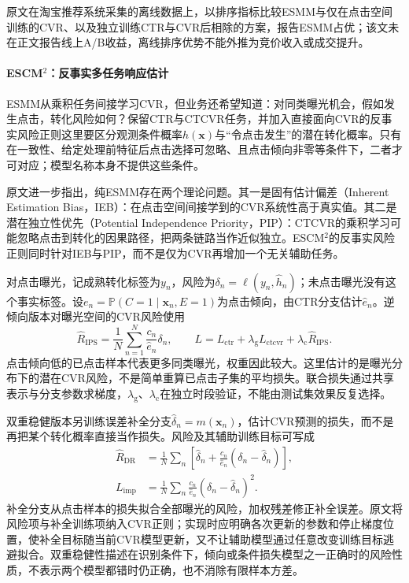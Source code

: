 原文在淘宝推荐系统采集的离线数据上，以排序指标比较ESMM与仅在点击空间训练的CVR、以及独立训练CTR与CVR后相除的方案，报告ESMM占优；该文未在正文报告线上A/B收益，离线排序优势不能外推为竞价收入或成交提升。

\Needspace{90mm}
\paragraph{ESCM$^2$：反事实多任务响应估计}
\label{sec:rs-advertising-escm2}

ESMM从乘积任务间接学习CVR，但业务还希望知道：对同类曝光机会，假如发生点击，转化风险如何？保留CTR与CTCVR任务，并加入直接面向CVR的反事实风险正则这里要区分观测条件概率$h(\bm{x})$与“令点击发生”的潜在转化概率。只有在一致性、给定处理前特征后点击选择可忽略、且点击倾向非零等条件下，二者才可对应；模型名称本身不提供这些条件。

原文进一步指出，纯ESMM存在两个理论问题。其一是固有估计偏差（Inherent Estimation Bias，IEB）：在点击空间间接学到的CVR系统性高于真实值。其二是潜在独立性优先（Potential Independence Priority，PIP）：CTCVR的乘积学习可能忽略点击到转化的因果路径，把两条链路当作近似独立。ESCM$^2$的反事实风险正则同时针对IEB与PIP，而不是仅为CVR再增加一个无关辅助任务。

对点击曝光，记成熟转化标签为$y_n$，风险为$\delta_n=\ell(y_n,\widehat h_n)$；未点击曝光没有这个事实标签。设$e_n=\mathbb{P}(C=1\mid\bm{x}_n,E=1)$为点击倾向，由CTR分支估计$\widehat e_n$。逆倾向版本对曝光空间的CVR风险使用
\begin{equation}
  \widehat R_{\mathrm{IPS}}
  =\frac{1}{N}\sum_{n=1}^{N}
    \frac{c_n}{\widehat e_n}\delta_n,\qquad
  L=L_{\mathrm{ctr}}+\lambda_{\mathrm{g}}L_{\mathrm{ctcvr}}
       +\lambda_{\mathrm{c}}\widehat R_{\mathrm{IPS}}.
  \label{eq:rs-advertising-escm2-ips}
\end{equation}
点击倾向低的已点击样本代表更多同类曝光，权重因此较大。这里估计的是曝光分布下的潜在CVR风险，不是简单重算已点击子集的平均损失。联合损失通过共享表示与分支参数求梯度，$\lambda_{\mathrm{g}}$、$\lambda_{\mathrm{c}}$在独立时段验证，不能由测试集效果反复选择。

双重稳健版本另训练误差补全分支$\widehat\delta_n=m(\bm{x}_n)$，估计CVR预测的损失，而不是再把某个转化概率直接当作损失。风险及其辅助训练目标可写成
\begin{equation}
  \begin{aligned}
    \widehat R_{\mathrm{DR}}
      &=\frac{1}{N}\sum_n
        \left[\widehat\delta_n+
          \frac{c_n}{\widehat e_n}
            (\delta_n-\widehat\delta_n)\right],\\
    L_{\mathrm{imp}}
      &=\frac{1}{N}\sum_n
        \frac{c_n}{\widehat e_n}
        (\delta_n-\widehat\delta_n)^2.
  \end{aligned}
  \label{eq:rs-advertising-escm2-dr}
\end{equation}
补全分支从点击样本的损失拟合全部曝光的风险，加权残差修正补全误差。原文将风险项与补全训练项纳入CVR正则；实现时应明确各次更新的参数和停止梯度位置，使补全目标随当前CVR模型更新，又不让辅助模型通过任意改变训练目标逃避拟合。双重稳健性描述在识别条件下，倾向或条件损失模型之一正确时的风险性质，不表示两个模型都错时仍正确，也不消除有限样本方差。

